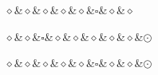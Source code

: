 \begin{exe}
\begin{minipage}[t]{2.5\treewidth}
\begin{xlist}
\begin{multicols}{2}
\columnbreak

\ex
\begin{minipage}[b][\treeheight]{\treewidth}
\phantom{$\odot$}\hspace{\fontdimen4\font}
\begin{dependency}[theme = simple, baseline=-\the\dimexpr\fontdimen22\textfont2\relax]
    \begin{deptext}
        $\diamond$\&$\diamond$\&$\diamond$\&$\diamond$\&$\diamond$\&$\square$\&$\diamond$\&$\diamond$\\
    \end{deptext}
\end{dependency}
\end{minipage}
\end{multicols}

\begin{multicols}{2}

\ex
\begin{minipage}[b][\treeheight]{\treewidth}
\phantom{$\odot$}\hspace{\fontdimen4\font}
\begin{dependency}[theme = simple, baseline=-\the\dimexpr\fontdimen22\textfont2\relax]
    \begin{deptext}
        $\diamond$\&$\diamond$\&$\square$\&$\diamond$\&$\diamond$\&$\diamond$\&$\diamond$\&$\diamond$\&$\odot$\\
    \end{deptext}
\end{dependency}
\end{minipage}

\columnbreak

\ex
\begin{minipage}[b][\treeheight]{\treewidth}
\phantom{$\odot$}\hspace{\fontdimen4\font}
\begin{dependency}[theme = simple, baseline=-\the\dimexpr\fontdimen22\textfont2\relax]
    \begin{deptext}
        $\diamond$\&$\diamond$\&$\diamond$\&$\diamond$\&$\diamond$\&$\square$\&$\diamond$\&$\diamond$\&$\odot$\\
    \end{deptext}
\end{dependency}
\end{minipage}
\end{multicols}

\end{xlist}
\end{minipage}
\end{exe}

